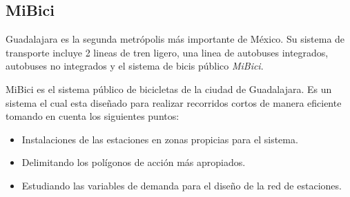 \subsection{MiBici}

Guadalajara es la segunda metrópolis más importante de México. Su sistema de transporte incluye 2 lineas de tren ligero, una linea de autobuses integrados, autobuses no integrados y el sistema de bicis público \textit{MiBici}.

MiBici es el sistema público de bicicletas de la ciudad de Guadalajara. Es un sistema el cual esta diseñado para realizar recorridos cortos de manera eficiente tomando en cuenta los siguientes puntos:

\begin{itemize}
  \item Instalaciones de las estaciones en zonas propicias para el sistema.
  \item Delimitando los polígonos de acción más apropiados.
  \item Estudiando las variables de demanda para el diseño de la red de estaciones.
\end{itemize}
